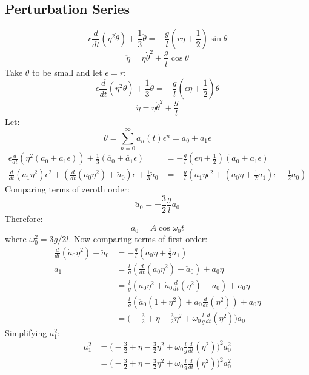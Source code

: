 \documentclass[9pt]{report}
\begin{document}
\begin{enumerate}
\subsection{Perturbation Series}
\[
r \frac{d}{dt}(\eta^2\dot{\theta}) + \frac{1}{3}\ddot{\theta} = -\frac{g}{l} (r\eta + \frac{1}{2}) \sin \theta
\]
\[
\ddot{\eta} = \eta \dot{\theta}^2 \label{el_theta} + \frac{g}{l}\cos \theta
\]
Take $\theta$ to be small and let $\epsilon = r$:
\[
\epsilon \frac{d}{dt}(\eta^2\dot{\theta}) + \frac{1}{3}\ddot{\theta} = -\frac{g}{l} (\epsilon \eta + \frac{1}{2}) \theta
\]
\[
\ddot{\eta} = \eta \dot{\theta}^2 \label{el_theta} + \frac{g}{l}
\]
Let:
\[
  \theta = \sum_{n = 0}^{\infty} a_n(t) \epsilon^n = a_0 + a_1 \epsilon
\]
\[
  \begin{align}
    \epsilon \frac{d}{dt}(\eta^2(\dot{a_0} + \dot{a_1}\epsilon)) + \frac{1}{3}(\ddot{a_0} + \ddot{a_1} \epsilon) &= -\frac{g}{l} (\epsilon \eta + \frac{1}{2}) (a_0 + a_1 \epsilon)  \\
  \frac{d}{dt}(\dot{a}_1\eta^2)\epsilon^2 +   ( \frac{d}{dt}(\dot{a}_0\eta^2)+ \ddot{a}_0 )\epsilon +  \frac{1}{3}\ddot{a}_0 &= -\frac{g}{l} (a_1 \eta \epsilon^2 + (a_0\eta + \frac{1}{2} a_1) \epsilon + \frac{1}{2}a_0)
  \end{align}
\]
Comparing terms of zeroth order:
\[
\ddot{a}_0 =  - \frac{3}{2} \frac{g}{l} a_0
\]
Therefore:
\[
  a_0 = A \cos\omega_0 t
\]
where $\omega_0^2 = 3 g / 2 l$.
Now comparing terms of first order:
\[
  \begin{align}
    \frac{d}{dt}(\dot{a}_0\eta^2)+ \ddot{a}_0 &= -\frac{g}{l}(a_0\eta + \frac{1}{2} a_1) \\
    a_1 &= \frac{l}{g} (\frac{d}{dt}(\dot{a}_0\eta^2)+ \ddot{a}_0 ) + a_0\eta \\
        &= \frac{l}{g} (\ddot{a}_0\eta^2+\dot{a}_0 \frac{d}{dt}(\eta^2)+ \ddot{a}_0 ) + a_0\eta  \\
        &= \frac{l}{g} (\ddot{a}_0(1 + \eta^2) +\dot{a}_0 \frac{d}{dt}(\eta^2)) + a_0\eta  \\
        &= \Big(-\frac{3}{2}+\eta -\frac{3}{2}\eta^2 + \omega_0 \frac{l}{g} \frac{d}{dt}(\eta^2) \Big)a_0
  \end{align}
\]
Simplifying $a_1^2$:
\[
  \begin{align}
    a_1^2 &= \Big(-\frac{3}{2}+\eta -\frac{3}{2}\eta^2 + \omega_0 \frac{l}{g} \frac{d}{dt}(\eta^2) \Big)^2 a_0^2 \\
          &= \Big(-\frac{3}{2}+\eta -\frac{3}{2}\eta^2 + \omega_0 \frac{l}{g} \frac{d}{dt}(\eta^2) \Big)^2 a_0^2 \\

\end{align}\]
\end{enumerate}
\end{document}
